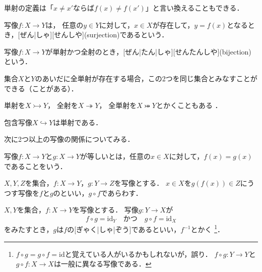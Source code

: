 \documentclass[../sotsu.tex]{subfiles}
\begin{document}
単射の定義は「$x \neq x'$ならば$f(x) \neq f(x')$」と言い換えることもできる．

\begin{definition}[全射]
    \label{dfn:surjection}
    写像$f \colon X \to Y$は，
    任意の$y \in Y$に対して，$x \in X$が存在して，$y = f(x)$となるとき，[ぜん|しゃ][せんしや](surjection)であるという．
\end{definition}

\begin{definition}[全単射]
    \label{dfn:bijection}
    写像$f \colon X \to Y$が単射かつ全射のとき，[ぜん|たん|しゃ][せんたんしや](bijection)という．
\end{definition}

集合$X$と$Y$のあいだに全単射が存在する場合，この2つを同じ集合とみなすことができる（ことがある）．

単射を$X \rightarrowtail Y$，
全射を$X \twoheadrightarrow Y$，
全単射を$X \twoheadrightarrowtail Y$とかくこともある%
\cite{unicode-arrows}\cite{unicode-arrows-B}．

\begin{example}
    包含写像$X \hookrightarrow Y$は単射である．
\end{example}

次に2つ以上の写像の関係についてみる．

\begin{definition}[写像の一致]
    写像$f \colon X \to Y$と$g \colon X \to Y$が等しいとは，任意の$x \in X$に対して，$f(x) = g(x)$であることをいう．
\end{definition}

\begin{definition}[写像の合成]
    \label{dfn:map-composition}
    $X, Y, Z$を集合，$f \colon X \to Y$，$g \colon Y \to Z$を写像とする．
    $x \in X$を$g(f(x)) \in Z$にうつす写像を$f$と$g$のといい，$g \circ f$であらわす．
\end{definition}

\begin{definition}[逆写像]
    \label{dfn:inverse-map}
    $X, Y$を集合，$f \colon X \to Y$を写像とする．
    写像$g \colon Y \to X$が
    \[  f \circ g = \mathrm{id}_Y  \quad \text{かつ} \quad  g \circ f = \mathrm{id}_X  \]
    をみたすとき，$g$は$f$の[ぎゃく|しゃ|ぞう]であるといい，$f^{-1}$とかく%
    \footnote{
        $f \circ g = g \circ f = \mathrm{id}$と覚えている人がいるかもしれないが，誤り．
        $f \circ g \colon Y \to Y$と$g \circ f \colon X \to X$は一般に異なる写像である．
    }．
\end{definition}
\end{document}
